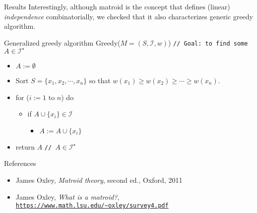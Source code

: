 \documentclass{beamer}
\newcommand{\I}{\mathcal{I}}
\begin{document}
\begin{frame}[t]
{Results}
Interestingly, although matroid is the concept that defines (linear) \emph{independence} combinatorially, we checked that it also characterizes generic greedy algorithm.
\begin{block}{Generalized greedy algorithm}
Greedy($M = (S, \I, w)$) \texttt{// Goal: to find some $A \in \I^\star$}
\begin{itemize}
    \item $A := \emptyset$
    \item Sort $S = \{x_1, x_2, \cdots, x_n\}$ so that $w(x_1) \ge w(x_2) \ge \cdots \ge w(x_n)$.
    \item for ($i:=1$ to $n$) do
    \begin{itemize}
        \item if $A \cup \{x_i\} \in \I$
        \begin{itemize}
            \item $A := A \cup \{x_i\}$
        \end{itemize}
    \end{itemize}
    \item return $A$ \texttt{// $A \in \I^\star$}
\end{itemize}
\end{block}
\end{frame}\begin{frame}[t]
{References}
\begin{itemize}
    \item James Oxley, \emph{Matroid theory}, second ed., Oxford, 2011
    \item James Oxley, \emph{What is a matroid?}, \texttt{\url{https://www.math.lsu.edu/~oxley/survey4.pdf}}
\end{itemize}
\end{frame}
\end{document}
